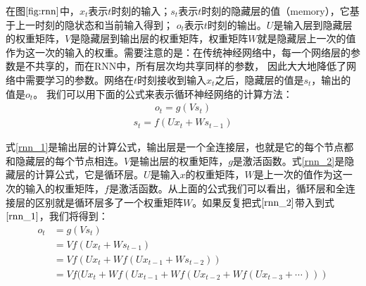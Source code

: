 在图$\ref{fig:rnn}$中，$x_{t}$表示$t$时刻的输入；$s_{t}$表示$t$时刻的隐藏层的值（memory），它基于上一时刻的隐状态和当前输入得到；
$o_{t}$表示$t$时刻的输出。$U$是输入层到隐藏层的权重矩阵，$V$是隐藏层到输出层的权重矩阵，权重矩阵$W$就是隐藏层上一次的值作为这一次的输入的权重。需要注意的是：在传统神经网络中，每一个网络层的参数是不共享的，而在RNN中，所有层次均共享同样的参数，
因此大大地降低了网络中需要学习的参数。网络在$t$时刻接收到输入$x_{t}$之后，隐藏层的值是$s_{t}$，输出的值是$o_{t}$。
我们可以用下面的公式来表示循环神经网络的计算方法：
\begin{equation}
\label{rnn_1}
\begin{aligned}
o_{t}=g(V s_{t})
\end{aligned}
\end{equation}
\begin{equation}
\label{rnn_2}
\begin{aligned}
s_{t}=f(U x_{t}+W s_{t-1})
\end{aligned}
\end{equation}

式\eqref{rnn_1}是输出层的计算公式，输出层是一个全连接层，也就是它的每个节点都和隐藏层的每个节点相连。$V$是输出层的权重矩阵，$g$是激活函数。式\eqref{rnn_2}是隐藏层的计算公式，它是循环层。$U$是输入$x$的权重矩阵，$W$是上一次的值作为这一次的输入的权重矩阵，$f$是激活函数。从上面的公式我们可以看出，循环层和全连接层的区别就是循环层多了一个权重矩阵$W$。如果反复把式$\eqref{rnn_2}$带入到式$\eqref{rnn_1}$，我们将得到：
\begin{equation}
\label{rnn_3}
\begin{aligned}
o_{t}&=g(V s_{t})\\
&=V f(U x_{t}+W s_{t-1})\\
&=V f(U x_{t}+W f(U x_{t-1}+W s_{t-2}))\\
&=V f(U x_{t}+W f(U x_{t-1}+W f(U x_{t-2}+W f(U x_{t-3}+\cdots)))\\
\end{aligned}
\end{equation}

